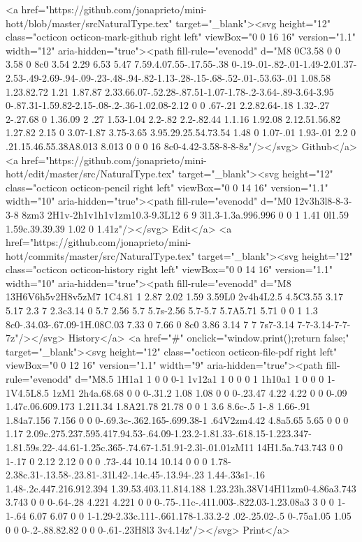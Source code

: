       <a href="https://github.com/jonaprieto/mini-hott/blob/master/srcNaturalType.tex" target="_blank"><svg height="12" class="octicon octicon-mark-github right left" viewBox="0 0 16 16" version="1.1" width="12" aria-hidden="true"><path fill-rule="evenodd" d="M8 0C3.58 0 0 3.58 0 8c0 3.54 2.29 6.53 5.47 7.59.4.07.55-.17.55-.38 0-.19-.01-.82-.01-1.49-2.01.37-2.53-.49-2.69-.94-.09-.23-.48-.94-.82-1.13-.28-.15-.68-.52-.01-.53.63-.01 1.08.58 1.23.82.72 1.21 1.87.87 2.33.66.07-.52.28-.87.51-1.07-1.78-.2-3.64-.89-3.64-3.95 0-.87.31-1.59.82-2.15-.08-.2-.36-1.02.08-2.12 0 0 .67-.21 2.2.82.64-.18 1.32-.27 2-.27.68 0 1.36.09 2 .27 1.53-1.04 2.2-.82 2.2-.82.44 1.1.16 1.92.08 2.12.51.56.82 1.27.82 2.15 0 3.07-1.87 3.75-3.65 3.95.29.25.54.73.54 1.48 0 1.07-.01 1.93-.01 2.2 0 .21.15.46.55.38A8.013 8.013 0 0 0 16 8c0-4.42-3.58-8-8-8z"/></svg> Github</a>
      <a href="https://github.com/jonaprieto/mini-hott/edit/master/src/NaturalType.tex" target="_blank"><svg height="12" class="octicon octicon-pencil right left" viewBox="0 0 14 16" version="1.1" width="10" aria-hidden="true"><path fill-rule="evenodd" d="M0 12v3h3l8-8-3-3-8 8zm3 2H1v-2h1v1h1v1zm10.3-9.3L12 6 9 3l1.3-1.3a.996.996 0 0 1 1.41 0l1.59 1.59c.39.39.39 1.02 0 1.41z"/></svg> Edit</a>
      <a href="https://github.com/jonaprieto/mini-hott/commits/master/src/NaturalType.tex" target="_blank"><svg height="12" class="octicon octicon-history right left" viewBox="0 0 14 16" version="1.1" width="10" aria-hidden="true"><path fill-rule="evenodd" d="M8 13H6V6h5v2H8v5zM7 1C4.81 1 2.87 2.02 1.59 3.59L0 2v4h4L2.5 4.5C3.55 3.17 5.17 2.3 7 2.3c3.14 0 5.7 2.56 5.7 5.7s-2.56 5.7-5.7 5.7A5.71 5.71 0 0 1 1.3 8c0-.34.03-.67.09-1H.08C.03 7.33 0 7.66 0 8c0 3.86 3.14 7 7 7s7-3.14 7-7-3.14-7-7-7z"/></svg> History</a>
      <a  href="#" onclick="window.print();return false;" target="_blank"><svg height="12" class="octicon octicon-file-pdf right left" viewBox="0 0 12 16" version="1.1" width="9" aria-hidden="true"><path fill-rule="evenodd" d="M8.5 1H1a1 1 0 0 0-1 1v12a1 1 0 0 0 1 1h10a1 1 0 0 0 1-1V4.5L8.5 1zM1 2h4a.68.68 0 0 0-.31.2 1.08 1.08 0 0 0-.23.47 4.22 4.22 0 0 0-.09 1.47c.06.609.173 1.211.34 1.8A21.78 21.78 0 0 1 3.6 8.6c-.5 1-.8 1.66-.91 1.84a7.156 7.156 0 0 0-.69.3c-.362.165-.699.38-1 .64V2zm4.42 4.8a5.65 5.65 0 0 0 1.17 2.09c.275.237.595.417.94.53-.64.09-1.23.2-1.81.33-.618.15-1.223.347-1.81.59s.22-.44.61-1.25c.365-.74.67-1.51.91-2.3l-.01.01zM11 14H1.5a.743.743 0 0 1-.17 0 2.12 2.12 0 0 0 .73-.44 10.14 10.14 0 0 0 1.78-2.38c.31-.13.58-.23.81-.31l.42-.14c.45-.13.94-.23 1.44-.33s1-.16 1.48-.2c.447.216.912.394 1.39.53.403.11.814.188 1.23.23h.38V14H11zm0-4.86a3.743 3.743 0 0 0-.64-.28 4.221 4.221 0 0 0-.75-.11c-.411.003-.822.03-1.23.08a3 3 0 0 1-1-.64 6.07 6.07 0 0 1-1.29-2.33c.111-.661.178-1.33.2-2 .02-.25.02-.5 0-.75a1.05 1.05 0 0 0-.2-.88.82.82 0 0 0-.61-.23H8l3 3v4.14z"/></svg> Print</a>
